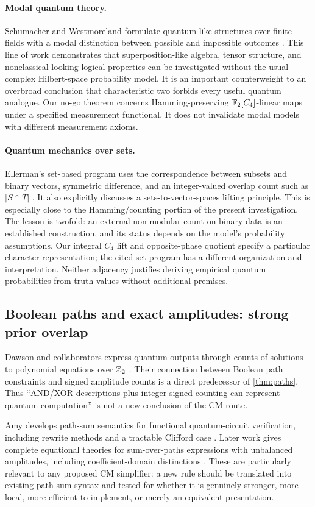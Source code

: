 \paragraph{Modal quantum theory.}
Schumacher and Westmoreland formulate quantum-like structures over finite fields with a modal distinction between possible and impossible outcomes \cite{modal}. This line of work demonstrates that superposition-like algebra, tensor structure, and nonclassical-looking logical properties can be investigated without the usual complex Hilbert-space probability model. It is an important counterweight to an overbroad conclusion that characteristic two forbids every useful quantum analogue. Our no-go theorem concerns Hamming-preserving $\mathbb F_2[C_4]$-linear maps under a specified measurement functional. It does not invalidate modal models with different measurement axioms.

\paragraph{Quantum mechanics over sets.}
Ellerman's set-based program uses the correspondence between subsets and binary vectors, symmetric difference, and an integer-valued overlap count such as $|S\cap T|$ \cite{ellerman}. It also explicitly discusses a sets-to-vector-spaces lifting principle. This is especially close to the Hamming/counting portion of the present investigation. The lesson is twofold: an external non-modular count on binary data is an established construction, and its status depends on the model's probability assumptions. Our integral $C_4$ lift and opposite-phase quotient specify a particular character representation; the cited set program has a different organization and interpretation. Neither adjacency justifies deriving empirical quantum probabilities from truth values without additional premises.

\subsection{Boolean paths and exact amplitudes: strong prior overlap}
Dawson and collaborators express quantum outputs through counts of solutions to polynomial equations over $\mathbb Z_2$ \cite{dawson}. Their connection between Boolean path constraints and signed amplitude counts is a direct predecessor of \cref{thm:paths}. Thus ``AND/XOR descriptions plus integer signed counting can represent quantum computation'' is not a new conclusion of the CM route.

Amy develops path-sum semantics for functional quantum-circuit verification, including rewrite methods and a tractable Clifford case \cite{amy2019}. Later work gives complete equational theories for sum-over-paths expressions with unbalanced amplitudes, including coefficient-domain distinctions \cite{amy2023}. These are particularly relevant to any proposed CM simplifier: a new rule should be translated into existing path-sum syntax and tested for whether it is genuinely stronger, more local, more efficient to implement, or merely an equivalent presentation.

